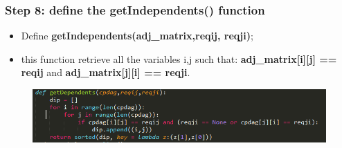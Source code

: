 \documentclass[xcolor ={table,usenames,dvipsnames}]{beamer}
\theoremstyle{definition}
\begin{document}
\begin{frame}
\frametitle{Step 8: define the getIndependents() function}
\begin{itemize}
	\item Define \textbf{getIndependents(adj\_matrix,reqij, reqji)};
	\item this function retrieve all the variables i,j such that: \textbf{adj\_matrix[i][j] == reqij} and \textbf{adj\_matrix[j][i] == reqji}.
\end{itemize}
	\begin{figure}[h!]
		\centering
		\includegraphics[scale=0.57]{img/getindep.PNG}
		\label{Interfacce di un CS}
	\end{figure}
\end{frame}
\end{document}
